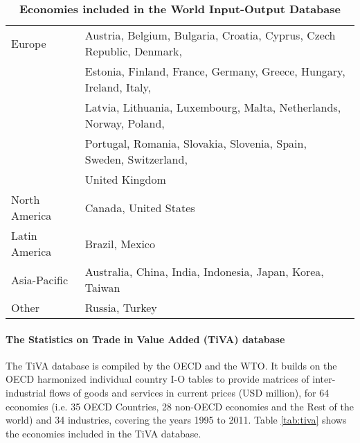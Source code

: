\documentclass[11pt,a4paper]{article}
\begin{document}
 
\begin{table}[!h]
\begin{threeparttable}
\centering
\centering
\caption{\small{\textbf{Economies included in the World Input-Output Database}}}
\small
\begin{tabular}{ll}
\hline\hline
Europe & Austria, Belgium, Bulgaria, Croatia, Cyprus, Czech Republic, Denmark,\\
& Estonia, Finland, France, Germany, Greece, Hungary, Ireland, Italy,\\
& Latvia, Lithuania, Luxembourg, Malta, Netherlands, Norway, Poland,\\
&Portugal, Romania, Slovakia, Slovenia, Spain, Sweden, Switzerland,\\
& United Kingdom\\
North  America& Canada, United States\\
Latin America & Brazil, Mexico \\
Asia-Pacific & Australia, China, India, Indonesia, Japan, Korea, Taiwan\\
Other & Russia, Turkey\\
\hline\hline
\end{tabular} 
\label{tab:wiod}
\end{threeparttable}
\end{table} 

\paragraph{The Statistics on Trade in Value Added (TiVA) database}
The TiVA database is compiled by the OECD and the WTO. It builds on the OECD harmonized individual country I-O tables to provide matrices of inter-industrial flows of goods and services in current prices (USD million), for 64 economies (i.e. 35 OECD Countries, 28 non-OECD economies and the Rest of the world) and 34 industries, covering the years 1995 to 2011. 
Table \ref{tab:tiva} shows the economies included in the TiVA database.
\end{document}
